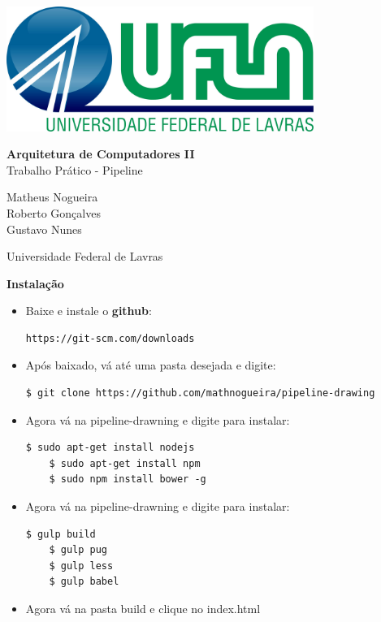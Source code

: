 \documentclass{article}
\begin{document}
    \begin{center}
	    \includegraphics[width=100mm,scale=1]{logo-ufla.jpg}	 
    \end{center}
    	 \vspace{1cm}
    \begin{center}
        \huge\textbf{Arquitetura de Computadores II}
        \vspace{3cm}\\
       \Large{ Trabalho Prático - Pipeline}\\
        \vspace{2cm}
        \end{center}
       \Large{ Matheus Nogueira\\
       Roberto Gonçalves\\
       Gustavo Nunes\\}
   
        \vspace{3cm}
        \begin{center}
        \huge Universidade Federal de Lavras
        \end{center}
 
    \clearpage
	\begin{center}
	\Large\textbf{Instalação}
	\end{center}
	
	\begin{itemize}
	\item Baixe e instale o \textbf{github}: 
	\begin{lstlisting}[style=DOS]
	 https://git-scm.com/downloads
\end{lstlisting}
	\item Após baixado, vá até uma pasta desejada e digite:
	\begin{lstlisting}[style=DOS]
	$ git clone https://github.com/mathnogueira/pipeline-drawing
\end{lstlisting}
	\item Agora vá na pipeline-drawning e digite para instalar:
	\begin{lstlisting}[style=DOS]
	$ sudo apt-get install nodejs
	$ sudo apt-get install npm
	$ sudo npm install bower -g
\end{lstlisting}
	\item Agora vá na pipeline-drawning e digite para instalar:
	\begin{lstlisting}[style=DOS]
	$ gulp build
	$ gulp pug
	$ gulp less
	$ gulp babel
\end{lstlisting}
	\item Agora vá na pasta build e clique no index.html


 \end{itemize}
\end{document}
